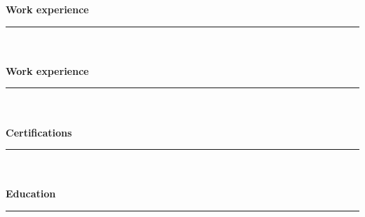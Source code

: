 \documentclass[11pt,a4paper,sans]{scrartcl}
\begin{document}
\begin{multicols}{2}
    {\Large \textbf{Work experience}}\\
    \rule{\columnwidth}{1mm}\\\\

    {\Large \textbf{Work experience}}\\
    \rule{\columnwidth}{1mm}\\\\
    
    {\Large \textbf{Certifications}}\\
    \rule{\columnwidth}{1mm}\\\\

    {\Large \textbf{Education}}\\
    \rule{\columnwidth}{1mm}\\\\
\end{multicols}
\end{document}
